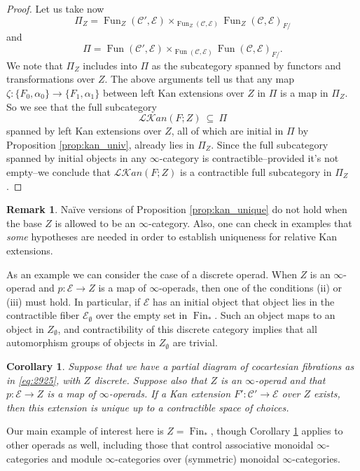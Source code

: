 \documentclass[reqno]{amsart}
\newtheorem{corollary}[lemma]{Corollary}
\theoremstyle{definition}
\newtheorem{remark}[lemma]{Remark}
\newcommand{\msc}[1]{\mathscr{#1}}
\DeclareMathOperator{\Fun}{Fun}
\DeclareMathOperator{\Fin}{Fin}
\renewcommand{\1}{\mathbf{1}}
\begin{document}
\begin{proof}
Let us take now
\[
\Pi_Z=\Fun_Z(\msc{C}',\msc{E})\times_{\Fun_Z(\msc{C},\msc{E})}\Fun_Z(\msc{C},\msc{E})_{F/}
\]
and
\[
\Pi=\Fun(\msc{C}',\msc{E})\times_{\Fun(\msc{C},\msc{E})}\Fun(\msc{C},\msc{E})_{F/}.
\]
We note that $\Pi_Z$ includes into $\Pi$ as the subcategory spanned by functors and transformations over $Z$.  The above arguments tell us that any map $\zeta:\{F_0,\alpha_0\}\to \{F_1,\alpha_1\}$ between left Kan extensions over $Z$ in $\Pi$ is a map in $\Pi_Z$.  So we see that the full subcategory
\[
\msc{L\!K}\!an(F;Z)\ \subseteq\ \Pi
\]
spanned by left Kan extensions over $Z$, all of which are initial in $\Pi$ by Proposition \ref{prop:kan_univ}, already lies in $\Pi_Z$.  Since the full subcategory spanned by initial objects in any $\infty$-category is contractible--provided it's not empty--we conclude that $\msc{L\!K}\!an(F;Z)$ is a contractible full subcategory in $\Pi_Z$.
\end{proof}

\begin{remark}
Na\"ive versions of Proposition \ref{prop:kan_unique} do not hold when the base $Z$ is allowed to be an $\infty$-category. Also, one can check in examples that \emph{some} hypotheses are needed in order to establish uniqueness for relative Kan extensions.
\end{remark}

As an example we can consider the case of a discrete operad. When $Z$ is an $\infty$-operad and $p:\msc{E}\to Z$ is a map of $\infty$-operads, then one of the conditions (ii) or (iii) must hold.  In particular, if $\msc{E}$ has an initial object that object lies in the contractible fiber $\msc{E}_{\emptyset}$ over the empty set in $\Fin_{\ast}$.  Such an object maps to an object in $Z_{\emptyset}$, and contractibility of this discrete category implies that all automorphism groups of objects in $Z_{\emptyset}$ are trivial.

\begin{corollary}\label{cor:kan_unique_operad}
Suppose that we have a partial diagram of cocartesian fibrations as in \eqref{eq:2925}, with $Z$ discrete.  Suppose also that $Z$ is an $\infty$-operad and that $p:\msc{E}\to Z$ is a map of $\infty$-operads.  If a Kan extension $F':\msc{C}'\to \msc{E}$ over $Z$ exists, then this extension is unique up to a contractible space of choices.
\end{corollary}

Our main example of interest here is $Z=\Fin_{\ast}$, though Corollary \ref{cor:kan_unique_operad} applies to other operads as well, including those that control associative monoidal $\infty$-categories and module $\infty$-categories over (symmetric) monoidal $\infty$-categories.
\par
\end{document}
